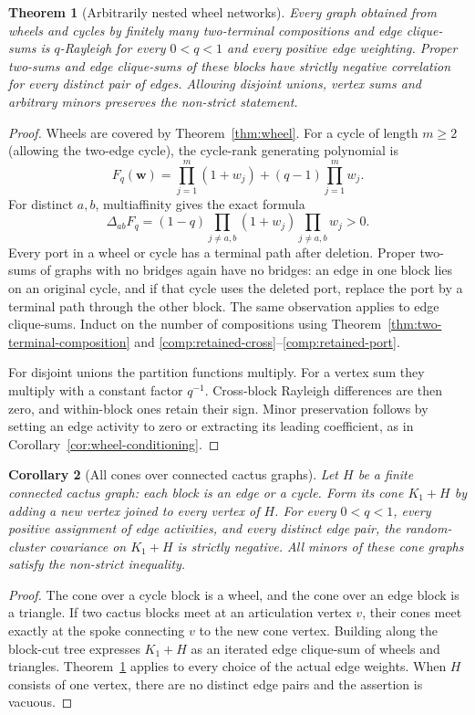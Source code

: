 \documentclass[11pt,a4paper]{article}
\newtheorem{theorem}{Theorem}[section]
\newtheorem{corollary}[theorem]{Corollary}
\theoremstyle{definition}
\theoremstyle{remark}\newtheorem{remark}[theorem]{Remark}
\begin{document}
\begin{theorem}[Arbitrarily nested wheel networks]
\label{thm:wheel-networks}
Every graph obtained from wheels and cycles by finitely many
two-terminal compositions and edge clique-sums is $q$-Rayleigh for
every $0<q<1$ and every positive edge weighting.
Proper two-sums and edge clique-sums of these blocks have strictly
negative correlation for every distinct pair of edges.
Allowing disjoint unions, vertex sums and arbitrary minors preserves
the non-strict statement.
\end{theorem}

\begin{proof}
Wheels are covered by Theorem~\ref{thm:wheel}. For a cycle of length
$m\ge2$ (allowing the two-edge cycle), the cycle-rank generating
polynomial is
\[
 F_q(\boldsymbol w)
 =\prod_{j=1}^m(1+w_j)+(q-1)\prod_{j=1}^m w_j.
\]
For distinct $a,b$, multiaffinity gives the exact formula
\[
 \Delta_{ab}F_q
 =(1-q)\prod_{j\ne a,b}(1+w_j)\prod_{j\ne a,b}w_j>0.
\]
Every port in a wheel or cycle has a terminal path after deletion.
Proper two-sums of graphs with no bridges again have no bridges:
an edge in one block lies on an original cycle, and if that cycle
uses the deleted port, replace the port by a terminal path through
the other block. The same observation applies to edge clique-sums.
Induct on the number of compositions using
Theorem~\ref{thm:two-terminal-composition} and
\eqref{comp:retained-cross}--\eqref{comp:retained-port}.

For disjoint unions the partition functions multiply. For a vertex
sum they multiply with a constant factor $q^{-1}$. Cross-block
Rayleigh differences are then zero, and within-block ones retain
their sign. Minor preservation follows by setting an edge activity
to zero or extracting its leading coefficient, as in
Corollary~\ref{cor:wheel-conditioning}.
\end{proof}

\begin{corollary}[All cones over connected cactus graphs]
\label{cor:cactus-cones}
Let $H$ be a finite connected cactus graph: each block is an edge or
a cycle. Form its cone $K_1+H$ by adding a new vertex joined to every
vertex of $H$. For every $0<q<1$, every positive assignment of edge
activities, and every distinct edge pair, the random-cluster
covariance on $K_1+H$ is strictly negative.
All minors of these cone graphs satisfy the non-strict inequality.
\end{corollary}

\begin{proof}
The cone over a cycle block is a wheel, and the cone over an edge
block is a triangle. If two cactus blocks meet at an articulation
vertex $v$, their cones meet exactly at the spoke connecting $v$
to the new cone vertex. Building along the block-cut tree expresses
$K_1+H$ as an iterated edge clique-sum of wheels and triangles.
Theorem~\ref{thm:wheel-networks} applies to every choice of the actual
edge weights. When $H$ consists of one vertex, there are no distinct
edge pairs and the assertion is vacuous.
\end{proof}
\end{document}
